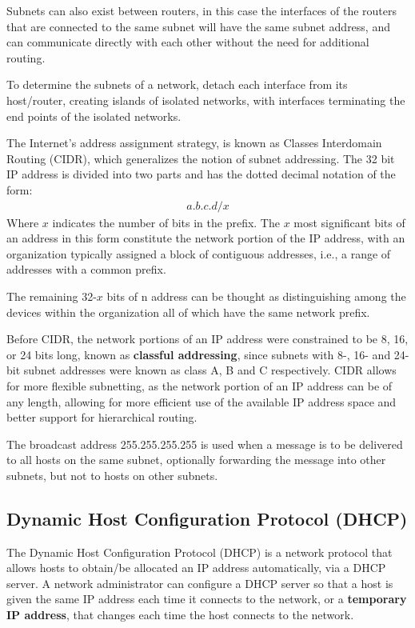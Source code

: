 \documentclass[12pt letter]{report}
\begin{document}
Subnets can also exist between routers, in this case the interfaces
of the routers that are connected to the same subnet will have the
same subnet address, and can communicate directly with each other
without the need for additional routing.

To determine the subnets of a network, detach each interface from its
host/router, creating islands of isolated networks, with interfaces
terminating the end points of the isolated networks.

The Internet's address assignment strategy, is known as Classes
Interdomain Routing (CIDR), which generalizes the notion of subnet
addressing. The 32 bit IP address is divided into two parts and has
the dotted decimal notation of the form:
\begin{align*}
  a.b.c.d/x
\end{align*}
Where $x$ indicates the number of bits in the prefix. The $x$ most
significant bits of an address in this form constitute the network
portion of the IP address, with an organization typically assigned a
block of contiguous addresses, i.e., a range of addresses with a common
prefix.

The remaining 32-$x$ bits of n address can be thought as
distinguishing among the devices within the organization all of which
have the same network prefix.

Before CIDR, the network portions of an IP address were constrained
to be 8, 16, or 24 bits long, known as \textbf{classful addressing},
since subnets with 8-, 16- and 24-bit subnet addresses were known as
class A, B and C respectively. CIDR allows for more flexible
subnetting, as the network portion of an IP address can be of any
length, allowing for more efficient use of the available IP address
space and better support for hierarchical routing.

The broadcast address 255.255.255.255 is used when a message is to be
delivered to all hosts on the same subnet, optionally forwarding the
message into other subnets, but not to hosts on other subnets.

\subsection{Dynamic Host Configuration Protocol (DHCP)}

The Dynamic Host Configuration Protocol (DHCP) is a network protocol
that allows hosts to obtain/be allocated an IP address automatically,
via a DHCP server. A network administrator can configure a DHCP
server  so that a host is given the same IP address each time it
connects to the network, or a \textbf{temporary IP address}, that
changes each time the host connects to the network.
\end{document}
